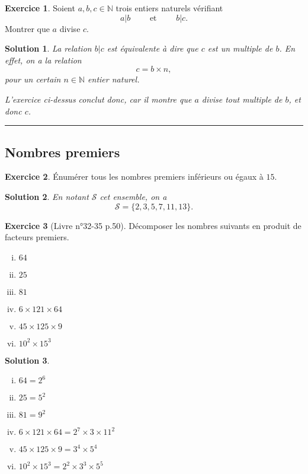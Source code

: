 \documentclass[a4paper, 14pt]{extarticle}
\theoremstyle{plain}
\newtheorem*{sol}{Solution}
\theoremstyle{definition}
\newtheorem{ex}{Exercice}
\newcommand{\N}{\mathbb{N}}
\newcommand{\exe}[2]{
		\begin{ex} #1  \end{ex}
		\begin{sol} #2 \end{sol}
	}
\newcommand{\exe}[2]{
		\begin{ex} #1  \end{ex}
	}
\begin{document}
\exe{
	Soient $a, b, c \in \N$ trois entiers naturels vérifiant
		\[ a | b \qquad  \text{ et } \qquad b | c. \]
	Montrer que $a$ divise $c$.
}{
	La relation $b | c$ est équivalente à dire que $c$ est un multiple de $b$. 
	En effet, on a la relation
		\[ c = b \times n, \]
	pour un certain $n\in\N$ entier naturel.
	
	L'exercice ci-dessus conclut donc, car il montre que $a$ divise tout multiple de $b$, et donc $c$.
}

\hrule

\subsection*{Nombres premiers}

\exe{
	Énumérer tous les nombres premiers inférieurs ou égaux à $15$.
}{
	En notant $\mathcal{S}$ cet ensemble, on a
	\[ \mathcal{S} = \{ 2, 3, 5, 7, 11, 13 \}. \]
}

\exe{[Livre n°32-35 p.50]
	Décomposer les nombres suivants en produit de facteurs premiers.
	\begin{multicols}{3}
	\begin{enumerate}[i)]
		\item  $64 $
		\item $25$
		\item $81$
		\item  $6 \times 121 \times 64$
		\item $45 \times 125 \times 9$
		\item $10^2 \times 15^3$
	\end{enumerate}
	\end{multicols}
}{

	\begin{multicols}{3}
	\begin{enumerate}[i)]
		\item  $64 = 2^6 $
		\item $25 = 5^2$
		\item $81 = 9^2$
		\item  $6 \times 121 \times 64 = 2^7 \times 3 \times 11^2$
		\item $45 \times 125 \times 9 = 3^4 \times 5^4$
		\item $10^2 \times 15^3 = 2^2 \times 3^3 \times 5^5$
	\end{enumerate}
	\end{multicols}


}
\end{document}
